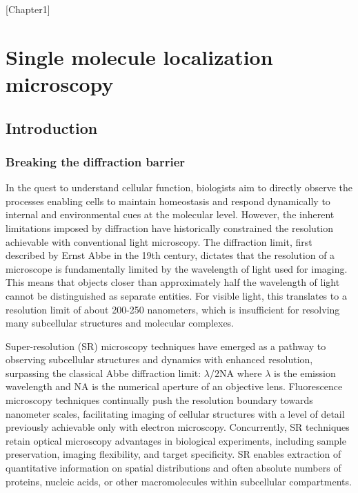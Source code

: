 [Chapter1]

\chapter{Single molecule localization microscopy}

\section{Introduction}

\subsection{Breaking the diffraction barrier}

In the quest to understand cellular function, biologists aim to directly observe the processes enabling cells to maintain homeostasis and respond dynamically to internal and environmental cues at the molecular level. However, the inherent limitations imposed by diffraction have historically constrained the resolution achievable with conventional light microscopy. The diffraction limit, first described by Ernst Abbe in the 19th century, dictates that the resolution of a microscope is fundamentally limited by the wavelength of light used for imaging. This means that objects closer than approximately half the wavelength of light cannot be distinguished as separate entities. For visible light, this translates to a resolution limit of about 200-250 nanometers, which is insufficient for resolving many subcellular structures and molecular complexes.

Super-resolution (SR) microscopy techniques have emerged as a pathway to observing subcellular structures and dynamics with enhanced resolution, surpassing the classical Abbe diffraction limit: $\lambda/2\mathrm{NA}$ where $\lambda$ is the emission wavelength and $\mathrm{NA}$ is the numerical aperture of an objective lens. Fluorescence microscopy techniques continually push the resolution boundary towards nanometer scales, facilitating imaging of cellular structures with a level of detail previously achievable only with electron microscopy. Concurrently, SR techniques retain optical microscopy advantages in biological experiments, including sample preservation, imaging flexibility, and target specificity. SR enables extraction of quantitative information on spatial distributions and often absolute numbers of proteins, nucleic acids, or other macromolecules within subcellular compartments. \parencite{Kong2013}

